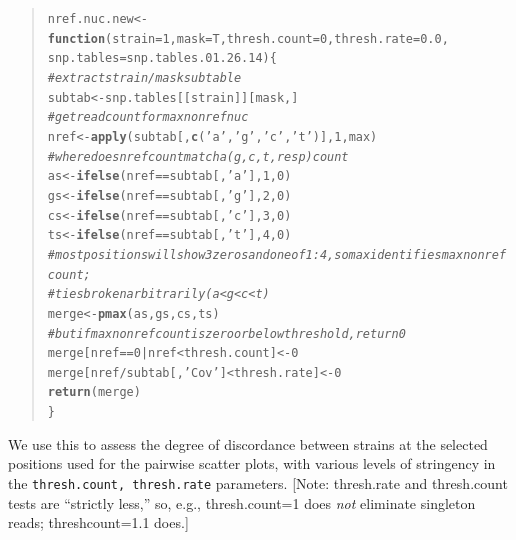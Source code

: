 \documentclass{article}\usepackage[]{graphicx}\usepackage[]{color}
\makeatletter
\newcommand{\hlnum}[1]{\textcolor[rgb]{0.686,0.059,0.569}{#1}}%
\newcommand{\hlstr}[1]{\textcolor[rgb]{0.192,0.494,0.8}{#1}}%
\newcommand{\hlcom}[1]{\textcolor[rgb]{0.678,0.584,0.686}{\textit{#1}}}%
\newcommand{\hlopt}[1]{\textcolor[rgb]{0,0,0}{#1}}%
\newcommand{\hlstd}[1]{\textcolor[rgb]{0.345,0.345,0.345}{#1}}%
\newcommand{\hlkwa}[1]{\textcolor[rgb]{0.161,0.373,0.58}{\textbf{#1}}}%
\newcommand{\hlkwb}[1]{\textcolor[rgb]{0.69,0.353,0.396}{#1}}%
\newcommand{\hlkwc}[1]{\textcolor[rgb]{0.333,0.667,0.333}{#1}}%
\newcommand{\hlkwd}[1]{\textcolor[rgb]{0.737,0.353,0.396}{\textbf{#1}}}%
\newenvironment{kframe}{%
 \def\at@end@of@kframe{}%
 \ifinner\ifhmode%
  \def\at@end@of@kframe{\end{minipage}}%
  \begin{minipage}{\columnwidth}%
 \fi\fi%
 \def\FrameCommand##1{\hskip\@totalleftmargin \hskip-\fboxsep
 \colorbox{shadecolor}{##1}\hskip-\fboxsep
     \hskip-\linewidth \hskip-\@totalleftmargin \hskip\columnwidth}%
 \MakeFramed {\advance\hsize-\width
   \@totalleftmargin\z@ \linewidth\hsize
   \@setminipage}}%
 {\par\unskip\endMakeFramed%
 \at@end@of@kframe}
\newenvironment{knitrout}{}{} %
\makeatother
\begin{document}
\begin{quote}
\begin{knitrout}\footnotesize
{}\color{fgcolor}\begin{kframe}
\begin{alltt}
\hlstd{nref.nuc.new} \hlkwb{<-} \hlkwa{function}\hlstd{(}\hlkwc{strain}\hlstd{=}\hlnum{1}\hlstd{,} \hlkwc{mask}\hlstd{=T,} \hlkwc{thresh.count}\hlstd{=}\hlnum{0}\hlstd{,} \hlkwc{thresh.rate}\hlstd{=}\hlnum{0.0}\hlstd{,}
                         \hlkwc{snp.tables}\hlstd{=snp.tables.01.26.14)\{}
  \hlcom{# extract strain/mask subtable}
  \hlstd{subtab} \hlkwb{<-} \hlstd{snp.tables[[strain]][mask,]}
  \hlcom{# get read count for max nonref nuc}
        \hlstd{nref} \hlkwb{<-} \hlkwd{apply}\hlstd{(subtab[,} \hlkwd{c}\hlstd{(}\hlstr{'a'}\hlstd{,} \hlstr{'g'}\hlstd{,} \hlstr{'c'}\hlstd{,} \hlstr{'t'}\hlstd{)],} \hlnum{1}\hlstd{, max)}
        \hlcom{# where does nref count match a (g,c,t, resp) count}
        \hlstd{as} \hlkwb{<-} \hlkwd{ifelse}\hlstd{(nref} \hlopt{==} \hlstd{subtab[,}\hlstr{'a'}\hlstd{],}\hlnum{1}\hlstd{,}\hlnum{0}\hlstd{)}
        \hlstd{gs} \hlkwb{<-} \hlkwd{ifelse}\hlstd{(nref} \hlopt{==} \hlstd{subtab[,}\hlstr{'g'}\hlstd{],}\hlnum{2}\hlstd{,}\hlnum{0}\hlstd{)}
        \hlstd{cs} \hlkwb{<-} \hlkwd{ifelse}\hlstd{(nref} \hlopt{==} \hlstd{subtab[,}\hlstr{'c'}\hlstd{],}\hlnum{3}\hlstd{,}\hlnum{0}\hlstd{)}
        \hlstd{ts} \hlkwb{<-} \hlkwd{ifelse}\hlstd{(nref} \hlopt{==} \hlstd{subtab[,}\hlstr{'t'}\hlstd{],}\hlnum{4}\hlstd{,}\hlnum{0}\hlstd{)}
        \hlcom{# most positions will show 3 zeros and one of 1:4, so max identifies max nonref count;}
        \hlcom{# ties broken arbitrarily  (a<g<c<t)}
        \hlstd{merge} \hlkwb{<-} \hlkwd{pmax}\hlstd{(as,gs,cs,ts)}
        \hlcom{# but if max nonref count is zero or below threshold, return 0}
        \hlstd{merge[nref} \hlopt{==} \hlnum{0} \hlopt{|} \hlstd{nref} \hlopt{<} \hlstd{thresh.count]} \hlkwb{<-} \hlnum{0}
        \hlstd{merge[nref}\hlopt{/}\hlstd{subtab[,}\hlstr{'Cov'}\hlstd{]} \hlopt{<} \hlstd{thresh.rate]} \hlkwb{<-} \hlnum{0}
        \hlkwd{return}\hlstd{(merge)}
\hlstd{\}}
\end{alltt}
\end{kframe}
\end{knitrout}

\end{quote}

We use this to assess the degree of discordance between strains at the selected positions used for the pairwise scatter plots, with various levels of stringency in the \texttt{thresh.count, thresh.rate} parameters.  [Note: thresh.rate and thresh.count tests are ``strictly less,'' so, e.g., thresh.count=1 does \emph{not} eliminate singleton reads; threshcount=1.1 does.]
\end{document}
